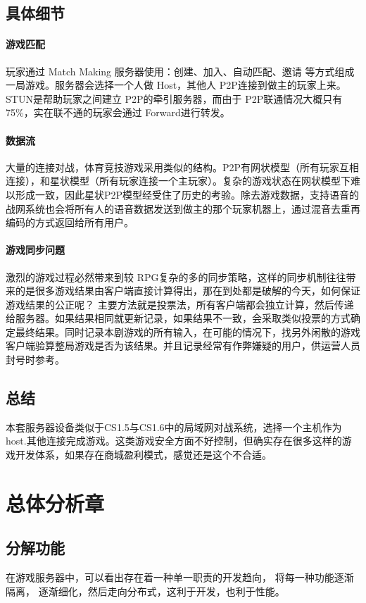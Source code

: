 \documentclass[UTF8,a4paper,8pt]{ctexart}
\begin{document}
		
		\subsection{具体细节}
			\paragraph{游戏匹配}玩家通过 Match Making 服务器使用：创建、加入、自动匹配、邀请 等方式组成一局游戏。服务器会选择一个人做 Host，其他人 P2P连接到做主的玩家上来。STUN是帮助玩家之间建立 P2P的牵引服务器，而由于 P2P联通情况大概只有 75\%，实在联不通的玩家会通过 Forward进行转发。
			
			\paragraph{数据流}大量的连接对战，体育竞技游戏采用类似的结构。P2P有网状模型（所有玩家互相连接），和星状模型（所有玩家连接一个主玩家）。复杂的游戏状态在网状模型下难以形成一致，因此星状P2P模型经受住了历史的考验。除去游戏数据，支持语音的战网系统也会将所有人的语音数据发送到做主的那个玩家机器上，通过混音去重再编码的方式返回给所有用户。
			
			\paragraph{游戏同步问题}激烈的游戏过程必然带来到较 RPG复杂的多的同步策略，这样的同步机制往往带来的是很多游戏结果由客户端直接计算得出，那在到处都是破解的今天，如何保证游戏结果的公正呢？
			主要方法就是投票法，所有客户端都会独立计算，然后传递给服务器。如果结果相同就更新记录，如果结果不一致，会采取类似投票的方式确定最终结果。同时记录本剧游戏的所有输入，在可能的情况下，找另外闲散的游戏客户端验算整局游戏是否为该结果。并且记录经常有作弊嫌疑的用户，供运营人员封号时参考。
			
		\subsection{总结}本套服务器设备类似于CS1.5与CS1.6中的局域网对战系统，选择一个主机作为host.其他连接完成游戏。这类游戏安全方面不好控制，但确实存在很多这样的游戏开发体系，如果存在商城盈利模式，感觉还是这个不合适。
		
\newpage
\section{总体分析章}
	\subsection{分解功能}在游戏服务器中，可以看出存在着一种单一职责的开发趋向， 将每一种功能逐渐隔离， 逐渐细化，然后走向分布式，这利于开发，也利于性能。
	
\end{document}
